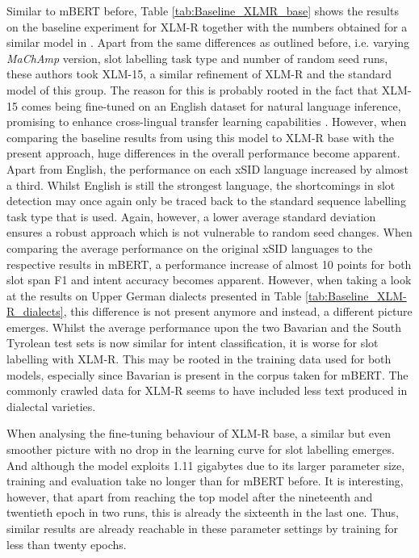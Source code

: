 \documentclass[11pt,a4paper,twoside,openright]{scrbook}
\begin{document}
Similar to mBERT before, Table \ref{tab:Baseline_XLMR_base} shows the results on the baseline experiment for XLM-R together with the numbers obtained for a similar model in \citet{van-der-goot-etal-2021-masked}. Apart from the same differences as outlined before, i.e. varying \textit{MaChAmp} version, slot labelling task type and number of random seed runs, these authors took XLM-15, a similar refinement of XLM-R and the standard model of this group. The reason for this is probably rooted in the fact that XLM-15 comes being fine-tuned on an English dataset for natural language inference, promising to enhance cross-lingual transfer learning capabilities \citep{lample2019cross}. However, when comparing the baseline results from \citet{van-der-goot-etal-2021-masked} using this model to XLM-R base with the present approach, huge differences in the overall performance become apparent. Apart from English, the performance on each xSID language increased by almost a third. Whilst English is still the strongest language, the shortcomings in slot detection may once again only be traced back to the standard sequence labelling task type that is used. Again, however, a lower average standard deviation ensures a robust approach which is not vulnerable to random seed changes. When comparing the average performance on the original xSID languages to the respective results in mBERT, a performance increase of almost 10 points for both slot span F1 and intent accuracy becomes apparent. However, when taking a look at the results on Upper German dialects presented in Table \ref{tab:Baseline_XLM-R_dialects}, this difference is not present anymore and instead, a different picture emerges. Whilst the average performance upon the two Bavarian and the South Tyrolean test sets is now similar for intent classification, it is worse for slot labelling with XLM-R. This may be rooted in the training data used for both models, especially since Bavarian is present in the corpus taken for mBERT. The commonly crawled data for XLM-R seems to have included less text produced in dialectal varieties.

When analysing the fine-tuning behaviour of XLM-R base, a similar but even smoother picture with no drop in the learning curve for slot labelling emerges. And although the model exploits 1.11 gigabytes due to its larger parameter size, training and evaluation take no longer than for mBERT before. It is interesting, however, that apart from reaching the top model after the nineteenth and twentieth epoch in two runs, this is already the sixteenth in the last one. Thus, similar results are already reachable in these parameter settings by training for less than twenty epochs.
\end{document}
